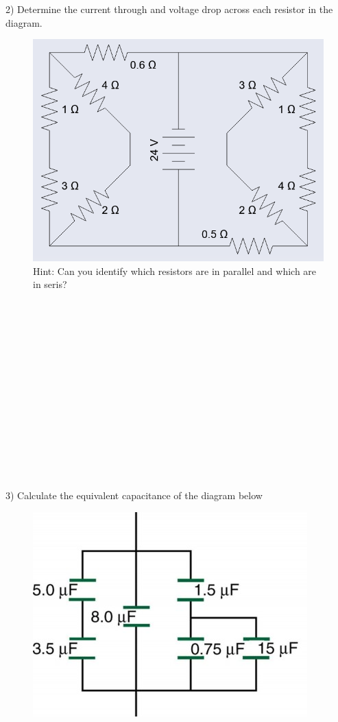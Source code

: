 \documentclass[12pt]{article}
\begin{document}
2) Determine the current through and voltage drop across each resistor in the diagram. \\
\begin{figure}[h]
    \centering
    \includegraphics{images/resistorCircuit.PNG}
    \caption{Hint: Can you identify which resistors are in parallel and which are in seris?}
    \label{fig:my_label}
\end{figure}
\\\\\\\\\\\\\\\\\\\\\\\\\\\\
3) Calculate the equivalent capacitance of the diagram below
\begin{figure}[h]
    \centering
    \includegraphics{images/capcacitors.jpg}
    
    \label{fig:my_label}
\end{figure}
\end{document}
